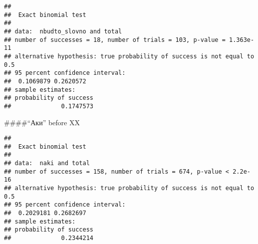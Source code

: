 \documentclass[
]{article}
\newenvironment{Shaded}{\begin{snugshade}}{\end{snugshade}}
\newcommand{\CommentTok}[1]{\textcolor[rgb]{0.56,0.35,0.01}{\textit{#1}}}
\newcommand{\DecValTok}[1]{\textcolor[rgb]{0.00,0.00,0.81}{#1}}
\newcommand{\KeywordTok}[1]{\textcolor[rgb]{0.13,0.29,0.53}{\textbf{#1}}}
\newcommand{\NormalTok}[1]{#1}
\newcommand{\OperatorTok}[1]{\textcolor[rgb]{0.81,0.36,0.00}{\textbf{#1}}}
\newcommand{\StringTok}[1]{\textcolor[rgb]{0.31,0.60,0.02}{#1}}
\begin{document}
\begin{verbatim}
## 
##  Exact binomial test
## 
## data:  nbudto_slovno and total
## number of successes = 18, number of trials = 103, p-value = 1.363e-11
## alternative hypothesis: true probability of success is not equal to 0.5
## 95 percent confidence interval:
##  0.1069879 0.2620572
## sample estimates:
## probability of success 
##              0.1747573
\end{verbatim}

\#\#\#\#``Аки'' before XX

\begin{Shaded}
\end{Shaded}

\begin{verbatim}
## 
##  Exact binomial test
## 
## data:  naki and total
## number of successes = 158, number of trials = 674, p-value < 2.2e-16
## alternative hypothesis: true probability of success is not equal to 0.5
## 95 percent confidence interval:
##  0.2029181 0.2682697
## sample estimates:
## probability of success 
##              0.2344214
\end{verbatim}
\end{document}
